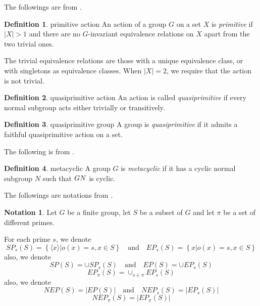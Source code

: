 \documentclass[a4paper]{article}
\theoremstyle{definition}
\newtheorem{definition}{Definition}
\newtheorem{notation}{Notation}
\begin{document}
The followings are from \citep{gelander_countable_2008}.

\begin{definition}{primitive action}
	An action of a group $G$ on a set  $X$ is \textit{primitive} if  $\left| X \right| > 1$ and there are no $G$-invariant equivalence relations on $X$ apart from the two trivial ones. 


	The trivial equivalence relations are those with a unique equivalence class, or with singletons as equivalence classes. When $\left| X \right| = 2$, we require that the action is not trivial.
\end{definition}

\begin{definition}{quasiprimitive action}
	An action is called \textit{quasiprimitive} if every normal subgroup acts either trivially or transitively.
\end{definition}

\begin{definition}{quasiprimitive group}
	A group is \textit{quasiprimitive} if it admits a faithful quasiprimitive action on a set.
\end{definition}

The following is from \citep{metacyclic}.

\begin{definition}{metacyclic}
	A group $G$ is \textit{metacyclic} if it has a cyclic normal subgroup  $N$ such that  $G \/ N$ is cyclic.
\end{definition}
	
The followings are notations from \citep{yang_regular_2020}.

\begin{notation}
	Let $G$ be a finite group, let  $S$ be a subset of  $G$ and let  $\pi$ be a set of different primes.

	For each prime $s$, we denote  \[
		SP_s(S) = \left\{ \langle x \rangle | o(x) = s,x \in S \right\} \quad \text{and} \quad EP_s(S) = \left\{ x | o(x) = s,x \in S \right\}  
	\] also, we denote \[
	SP(S) = \cup SP_s(S) \quad \text{and} \quad EP(S) = \cup EP_s(S)
	\]  \[
	EP_{\pi}(S) = \cup_{s \in \pi} EP_s(S)
	\] also, we denote \[
	NEP(S) = \left| EP(S) \right| \quad \text{and} \quad NEP_s(S) = \left| EP_s(S) \right| 
	\] \[
	NEP_{\pi}(S) = \left| EP_{\pi}(S) \right| 
	\] 
	
\end{notation}
\end{document}
